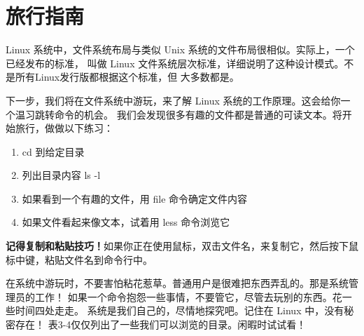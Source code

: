 \section{旅行指南} %
\label{sec:旅行指南}

Linux 系统中，文件系统布局与类似 Unix 系统的文件布局很相似。实际上，一个已经发布的标准， 叫做 Linux 文件系统层次标准，详细说明了这种设计模式。不是所有Linux发行版都根据这个标准，但 大多数都是。

\par 下一步，我们将在文件系统中游玩，来了解 Linux 系统的工作原理。这会给你一个温习跳转命令的机会。 我们会发现很多有趣的文件都是普通的可读文本。将开始旅行，做做以下练习：
\begin{enumerate}
	\item cd 到给定目录
	\item 列出目录内容 ls -l
	\item 如果看到一个有趣的文件，用 file 命令确定文件内容
	\item 如果文件看起来像文本，试着用 less 命令浏览它
\end{enumerate}
\fboxrule=3pt \fboxsep=2pt
\begin{colorboxed}[boxcolor=lightgray,bgcolor=white]
\textbf{记得复制和粘贴技巧！}如果你正在使用鼠标，双击文件名，来复制它，然后按下鼠标中键，粘贴文件名到命令行中。
\end{colorboxed}

\par 在系统中游玩时，不要害怕粘花惹草。普通用户是很难把东西弄乱的。那是系统管理员的工作！ 如果一个命令抱怨一些事情，不要管它，尽管去玩别的东西。花一些时间四处走走。 系统是我们自己的，尽情地探究吧。记住在 Linux 中，没有秘密存在！ 表3-4仅仅列出了一些我们可以浏览的目录。闲暇时试试看！



